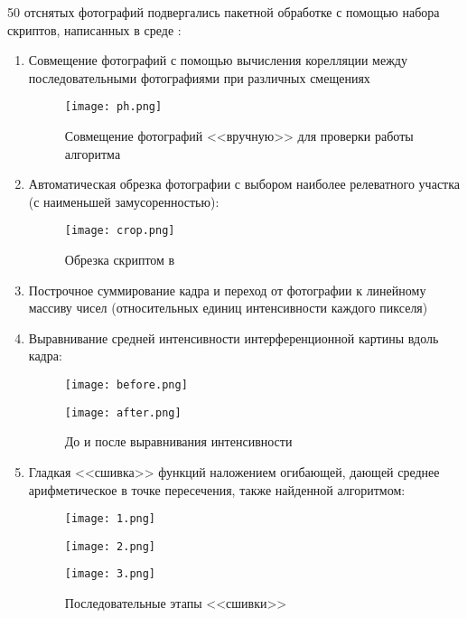 \documentclass{urticle}
\begin{document}
  50 отснятых фотографий подвергались пакетной обработке с помощью набора скриптов, написанных в среде :
  \begin{enumerate}
  	\item Совмещение фотографий с помощью вычисления корелляции между последовательными фотографиями при различных смещениях
  	\begin{figure}[H]
	\centering
  	\texttt{[image: ph.png]}
  \caption{Совмещение фотографий <<вручную>> для проверки работы алгоритма}
  \end{figure}
  
  	\item Автоматическая обрезка фотографии с выбором наиболее релеватного участка (с наименьшей замусоренностью):
  	
  	\begin{figure}[H]
	\centering
  	\texttt{[image: crop.png]}
  \caption{Обрезка скриптом в }
  \end{figure}
  
  \item Построчное суммирование кадра и переход от фотографии к линейному массиву чисел (относительных единиц интенсивности каждого пикселя)
  \item Выравнивание средней интенсивности интерференционной картины вдоль кадра:
  \begin{figure}[H]
  \centering
  	\begin{minipage}[t]{0.7\textwidth}
  		\texttt{[image: before.png]}
  	\end{minipage}
  	\centering
  	\begin{minipage}[t]{0.7\textwidth}
  		\texttt{[image: after.png]}
  	\end{minipage}
  	\caption{До и после выравнивания интенсивности}
  \end{figure}
  
  \item Гладкая <<сшивка>> функций наложением огибающей, дающей среднее арифметическое в точке пересечения, также найденной алгоритмом:
  
  \begin{figure}[H]
  \centering
  	\begin{minipage}[t]{0.7\textwidth}
  		\texttt{[image: 1.png]}
  	\end{minipage}
  	\centering
  	\begin{minipage}[t]{0.7\textwidth}
  		\texttt{[image: 2.png]}
  	\end{minipage}
  	\centering
  	\begin{minipage}[t]{0.7\textwidth}
  		\texttt{[image: 3.png]}
  	\end{minipage}
  	\caption{Последовательные этапы <<сшивки>>}
  \end{figure}
  \end{enumerate}
  
\end{document}
